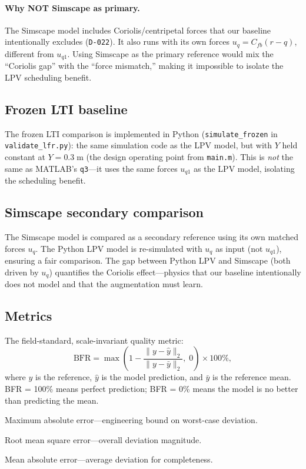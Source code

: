 \documentclass[11pt,a4paper]{article}
\newcommand{\decref}[1]{\texttt{D-#1}}
\newcommand{\pyfile}[1]{\texttt{#1}}
\begin{document}
\paragraph{Why NOT Simscape as primary.}
The Simscape model includes Coriolis/centripetal forces that our baseline intentionally
excludes (\decref{022}). It also runs with its own forces $u_q = C_{fb}(r - q)$, different
from $u_{q1}$. Using Simscape as the primary reference would mix the ``Coriolis gap'' with
the ``force mismatch,'' making it impossible to isolate the LPV scheduling benefit.

\subsection{Frozen LTI baseline}

The frozen LTI comparison is implemented in Python (\texttt{simulate\_frozen} in
\pyfile{validate\_lfr.py}): the same simulation code as the LPV model, but with $Y$ held
constant at $Y = 0.3\;\text{m}$ (the design operating point from \texttt{main.m}). This is
\emph{not} the same as MATLAB's \texttt{q3}---it uses the same forces $u_{q1}$ as the LPV
model, isolating the scheduling benefit.

\subsection{Simscape secondary comparison}

The Simscape model is compared as a secondary reference using its own matched forces $u_q$.
The Python LPV model is re-simulated with $u_q$ as input (not $u_{q1}$), ensuring a fair
comparison. The gap between Python LPV and Simscape (both driven by $u_q$) quantifies the
Coriolis effect---physics that our baseline intentionally does not model and that the
augmentation must learn.

\subsection{Metrics}

\begin{description}[nosep]
\item[BFR (Best Fit Rate)] The field-standard, scale-invariant quality metric:
\begin{equation}
\label{eq:bfr}
\text{BFR} = \max\!\left(1 - \frac{\|y - \hat{y}\|_2}{\|y - \bar{y}\|_2},\; 0\right) \times 100\%,
\end{equation}
where $y$ is the reference, $\hat{y}$ is the model prediction, and $\bar{y}$ is the
reference mean. BFR = 100\% means perfect prediction; BFR = 0\% means the model is no
better than predicting the mean.
\item[$\max|e|$] Maximum absolute error---engineering bound on worst-case deviation.
\item[RMSE] Root mean square error---overall deviation magnitude.
\item[$\text{Mean}|e|$] Mean absolute error---average deviation for completeness.
\end{description}
\end{document}
